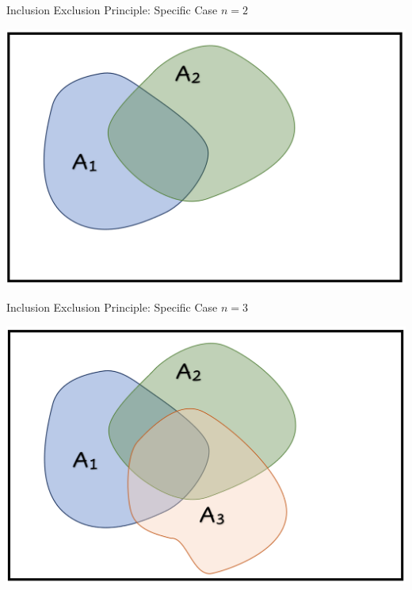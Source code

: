 \documentclass[compress]{beamer}
\begin{document}
\begin{frame}{Inclusion Exclusion Principle: Specific Case  $n=2$}
\begin{center}
\includegraphics[scale=.3]{figs/InclusionExclusion2.png}
\end{center}

	\vspace{1in}
\end{frame}




\begin{frame}{Inclusion Exclusion Principle: Specific Case  $n=3$}
\begin{center}
\includegraphics[scale=.3]{figs/InclusionExclusion3.png}
\end{center}

	\vspace{1in}
\end{frame}
\end{document}
